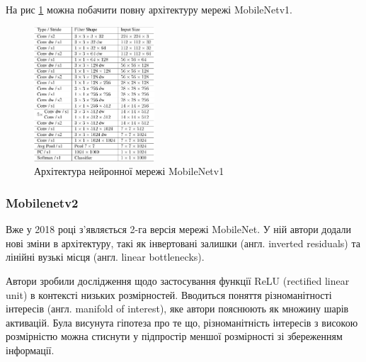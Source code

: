 На рис \ref{fig:cnn:mobilenetv1_architecture} можна побачити повну архітектуру мережі MobileNetv1.

\begin{figure}[H]
    \centering
    \includegraphics[width=0.4\textwidth]{images/cnn_mobilenetv1_architecture}
    \caption{Архітектура нейронної мережі MobileNetv1   \cite{mobilenetv1}
        \label{fig:cnn:mobilenetv1_architecture}
    }
\end{figure}

\subsubsection{Mobilenetv2}

Вже у 2018 році з'являється 2-га версія мережі MobileNet. У ній автори додали нові зміни в
архітектуру, такі як інвертовані залишки (англ. inverted residuals) та
лінійні вузькі місця (англ. linear bottlenecks).

Автори зробили дослідження щодо застосування функції ReLU (rectified linear unit) в
контексті низьких розмірностей. Вводиться поняття різноманітності інтересів  (англ. manifold of interest),
яке автори пояснюють як множину шарів активацій. Була висунута гіпотеза про те що,
різноманітність інтересів з високою розмірністю можна стиснути у підпростір меншої розмірності
зі збереженням інформації.

